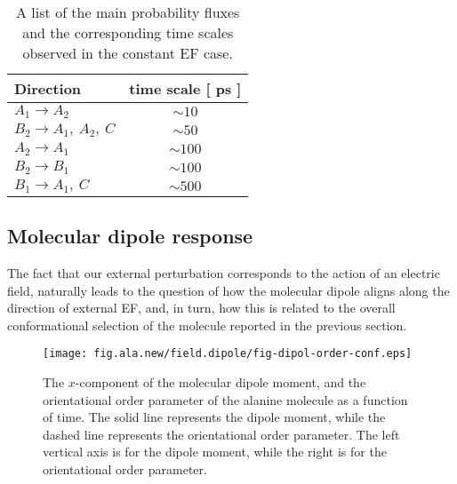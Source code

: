 \documentclass[a4paper,preprint,unsortedaddress,onecolumn]{revtex4-1}
\newcommand{\recheck}[1]{{\color{red} #1}}
\begin{document}
\begin{table}
  \centering
  \begin{tabular*}{0.4\textwidth}{@{\extracolsep{\fill}}lc}\hline\hline
    Direction        & time scale [ ps ] \\\hline
    $A_1\rightarrow A_2$        &       $\sim 10$      \\
    $B_2\rightarrow A_1,\ A_2,\ C$        &       $\sim 50$      \\    
    $A_2\rightarrow A_1$        &       $\sim 100$      \\
    $B_2\rightarrow B_1$        &       $\sim 100$      \\    
    $B_1\rightarrow A_1,\ C$        &       $\sim 500$      \\    \hline\hline
  \end{tabular*}
  \caption{A list of the main probability fluxes and the corresponding time scales observed in the constant EF case.}
  \label{tab:tmp1}
\end{table}



\subsection{Molecular dipole response}
The fact that our external perturbation corresponds to the action of
an electric field, naturally leads to the question of how
\recheck{
  the molecular dipole aligns along the direction of external EF}, and, in turn, how this is related
to the overall \recheck{conformational selection} of the molecule reported in
the previous section.
\begin{figure}
  \centering
  \texttt{[image: fig.ala.new/field.dipole/fig-dipol-order-conf.eps]}
  \caption{The
    $x$-component of the molecular dipole moment, and the orientational order parameter
    of the alanine molecule as a
    function of time. The solid line represents the dipole moment,
    while the dashed line represents the orientational order parameter.
    The left vertical axis is for the dipole moment, while
    the right is for the orientational order parameter.
  }
  \label{fig:tmp3}
\end{figure}
\end{document}
